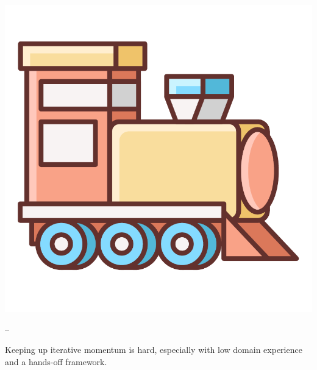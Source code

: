 \documentclass[xcolor=svgnames,10pt,aspectratio=1610]{beamer}
\begin{document}
\begin{frame}
\begin{minipage}{0.7\textwidth}
\begin{minipage}{0.05\textwidth}
      \includegraphics[width=\textwidth]{img/train.pdf}
    \end{minipage}
    \hspace{0.15cm}
    --
    \hspace{0.15cm}
    \begin{minipage}{0.9\textwidth}
      Keeping up iterative momentum is hard, especially with low domain
      experience and a hands-off framework.
    \end{minipage}
  \end{minipage}

  \vspace{0.8cm} \\


\end{frame}
\end{document}
